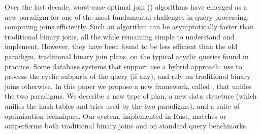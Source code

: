 Over the last decade, worst-case optimal join (\WCOJ) algorithms have
emerged as a new paradigm for one of the most fundamental challenges
in query processing: computing joins efficiently.  Such an algorithm
can be asymptotically faster than traditional binary joins, all the
while remaining simple to understand and implement.  However, they
have been found to be less efficient than the old paradigm,
traditional binary join plans, on the typical acyclic queries found in
practice.  Some database systems that support \WCOJ use a hybrid
approach: use \WCOJ to process the cyclic subparts of the query (if
any), and rely on traditional binary joins otherwise.  In this paper
we propose a new framework, called \FJ, that unifies the two
paradigms.  We describe a new type of plan, a new data structure
(which unifies the hash tables and tries used by the two paradigms),
and a suite of optimization techniques.  Our system, implemented in
Rust, matches or outperforms both traditional binary joins and \WCOJ on
standard query benchmarks.
